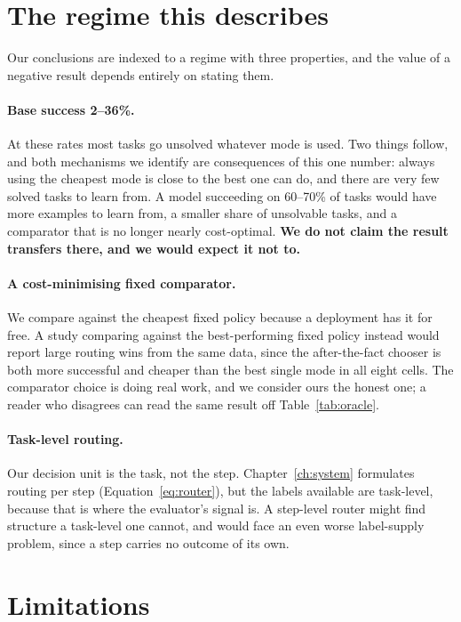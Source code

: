 \section{The regime this describes}
\label{sec:regime-boundary}

Our conclusions are indexed to a regime with three properties, and the value of a negative result depends entirely on stating them.

\paragraph{Base success 2--36\%.} At these rates most tasks go unsolved
whatever mode is used. Two things follow, and both mechanisms we identify are
consequences of this one number: always using the cheapest mode is close to
the best one can do, and there are very few solved tasks to learn from. A
model succeeding on 60--70\% of tasks would have more examples to learn from,
a smaller share of unsolvable tasks, and a comparator that is no longer nearly
cost-optimal. \textbf{We do not claim the result
transfers there, and we would expect it not to.}

\paragraph{A cost-minimising fixed comparator.} We compare against the cheapest
fixed policy because a deployment has it for free. A study comparing against
the best-performing fixed policy instead would report large routing wins from
the same data, since the after-the-fact chooser is both more successful and
cheaper than the best single mode in all eight cells. The comparator
choice is doing real work, and we consider ours the honest one; a reader who
disagrees can read the same result off Table~\ref{tab:oracle}.

\paragraph{Task-level routing.} Our decision unit is the task, not the step.
Chapter~\ref{ch:system} formulates routing per step
(Equation~\ref{eq:router}), but the labels available are task-level, because
that is where the evaluator's signal is. A step-level router might find
structure a task-level one cannot, and would face an even worse label-supply problem, since a step carries no outcome of its own.

\section{Limitations}
\label{sec:limitations}

